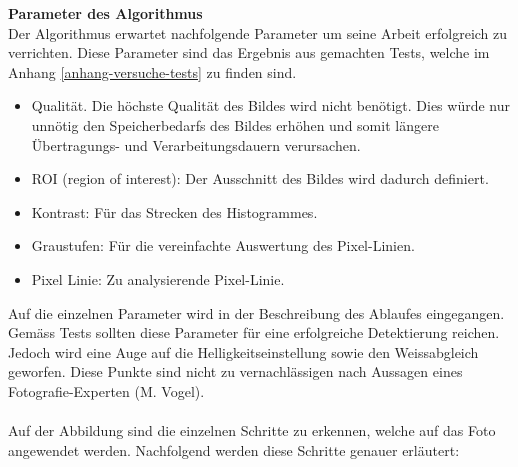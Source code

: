 \textbf{Parameter des Algorithmus}\\
Der Algorithmus erwartet nachfolgende Parameter um seine Arbeit erfolgreich zu verrichten. Diese Parameter sind das Ergebnis aus gemachten Tests, welche im Anhang \ref{anhang-versuche-tests} zu finden sind.
\begin{itemize}
	\item Qualität. Die höchste Qualität des Bildes wird nicht benötigt. Dies würde nur unnötig den Speicherbedarfs des Bildes erhöhen und somit längere Übertragungs- und Verarbeitungsdauern verursachen. 
	\item ROI (region of interest): Der Ausschnitt des Bildes wird dadurch definiert.
	\item Kontrast: Für das Strecken des Histogrammes.
	\item Graustufen: Für die vereinfachte Auswertung des Pixel-Linien.
	\item Pixel Linie: Zu analysierende Pixel-Linie.
\end{itemize}
Auf die einzelnen Parameter wird in der Beschreibung des Ablaufes eingegangen. Gemäss Tests sollten diese Parameter für eine erfolgreiche Detektierung reichen. Jedoch wird eine Auge auf die Helligkeitseinstellung sowie den Weissabgleich geworfen. Diese Punkte sind nicht zu vernachlässigen nach Aussagen eines Fotografie-Experten (M. Vogel).\\
\\
Auf der Abbildung sind die einzelnen Schritte zu erkennen, welche auf das Foto angewendet werden. Nachfolgend werden diese Schritte genauer erläutert:
